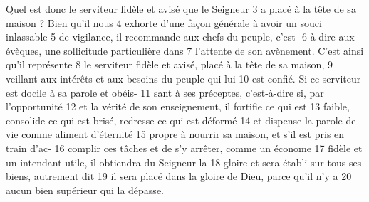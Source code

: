 Quel est donc le serviteur fidèle et avisé que le Seigneur	 
3	 	a placé à la tête de sa maison ? Bien qu'il nous	 
4	 	exhorte d'une façon générale à avoir un souci inlassable	 
5	 	de vigilance, il recommande aux chefs du peuple, c'est-	 
6	 	à-dire aux évèques, une sollicitude particulière dans	 
7	 	l'attente de son avènement. C'est ainsi qu'il représente	 
8	 	le serviteur fidèle et avisé, placé à la tête de sa maison,	 
9	 	veillant aux intérêts et aux besoins du peuple qui lui	 
10	 	est confié. Si ce serviteur est docile à sa parole et obéis-	 
11	 	sant à ses préceptes, c'est-à-dire si, par l'opportunité	 
12	 	et la vérité de son enseignement, il fortifie ce qui est	 
13	 	faible, consolide ce qui est brisé, redresse ce qui est déformé	 
14	 	et dispense la parole de vie comme aliment d'éternité	 
15	 	propre à nourrir sa maison, et s'il est pris en train d'ac-	 
16	 	complir ces tâches et de s'y arrêter, comme un économe	 
17	 	fidèle et un intendant utile, il obtiendra du Seigneur la	 
18	 	gloire et sera établi sur tous ses biens, autrement dit	 
19	 	il sera placé dans la gloire de Dieu, parce qu'il n'y a	 
20	 	aucun bien supérieur qui la dépasse.